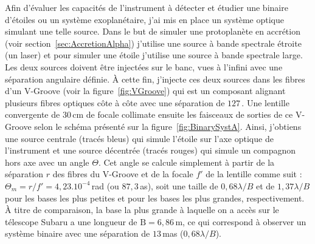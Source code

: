 Afin d'évaluer les capacités de l'instrument à détecter et étudier une binaire d'étoiles ou un système exoplanétaire, j'ai mis en place un système optique simulant une telle source. Dans le but de simuler une protoplanète en accrétion (voir section~\ref{sec:AccretionAlpha}) j'utilise une source à bande spectrale étroite (un laser) et pour simuler une étoile j'utilise une source à bande spectrale large. Les deux sources doivent être injectées sur le banc, vues à l'infini avec une séparation angulaire définie. À cette fin, j'injecte ces deux sources dans les fibres d'un V-Groove (voir la figure~\ref{fig:VGroove}) qui est un composant alignant plusieurs fibres optiques côte à côte avec une séparation de $127 \,$\um. Une lentille convergente de $30 \,$cm de focale collimate ensuite les faisceaux de sorties de ce V-Groove selon le schéma présenté sur la figure~\ref{fig:BinarySystA}. Ainsi, j'obtiens une source centrale (tracés bleus) qui simule l'étoile sur l'axe optique de l'instrument et une source décentrée (tracés rouges) qui simule un compagnon hors axe avec un angle $\Theta$. Cet angle se calcule simplement à partir de la séparation $r$ des fibres du V-Groove et de la focale $f'$ de la lentille comme suit : $\Theta_m = r / f' = 4,23 . 10^{-4} \,$rad (ou $87,3 \,$as), soit une taille de $0,68 \lambda / B$ et de $1,37 \lambda / B$ pour les bases les plus petites et pour les bases les plus grandes, respectivement. À titre de comparaison, la base la plus grande à laquelle on a accès sur le télescope Subaru a une longueur de $\text{B} = 6,86 \,$m, ce qui correspond à observer un système binaire avec une séparation de $13 \,$mas ($0,68 \lambda / B$).

